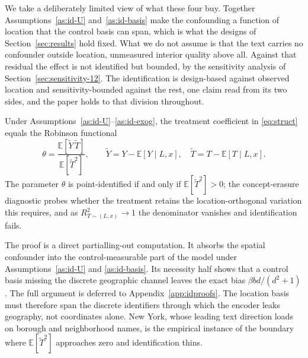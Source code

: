 We take a deliberately limited view of what these four buy. Together
Assumptions~\ref{as:id-U} and~\ref{as:id-basis} make the confounding a function of
location that the control basis can span, which is what the designs of
Section~\ref{sec:results} hold fixed. What we do not assume is that the text carries no
confounder outside location, unmeasured interior quality above all. Against that
residual the effect is not identified but bounded, by the sensitivity analysis of
Section~\ref{sec:sensitivity-12}. The identification is design-based against observed
location and sensitivity-bounded against the rest, one claim read from its two sides,
and the paper holds to that division throughout.

\begin{theorem}[Identification]\label{thm:id}
Under Assumptions~\ref{as:id-U}--\ref{as:id-exog}, the treatment coefficient in
\eqref{eq:struct} equals the Robinson functional
\[
\theta=\frac{\mathbb{E}\!\left[\tilde Y\,\tilde T\right]}{\mathbb{E}\!\left[\tilde T^{2}\right]},
\qquad
\tilde Y=Y-\mathbb{E}[Y\mid L,x],\quad \tilde T=T-\mathbb{E}[T\mid L,x].
\]
The parameter $\theta$ is point-identified if and only if $\mathbb{E}[\tilde T^{2}]>0$;
the concept-erasure diagnostic probes whether the treatment retains the
location-orthogonal variation this requires, and as $R^2_{T\sim(L,x)}\to1$ the
denominator vanishes and identification fails.
\end{theorem}

The proof is a direct partialling-out computation. It absorbs the spatial
confounder into the control-measurable part of the model under
Assumptions~\ref{as:id-U} and \ref{as:id-basis}. Its necessity half shows that
a control basis missing the discrete geographic channel leaves the exact bias
$\beta bd/(d^2+1)$. The full argument is deferred to
Appendix~\ref{app:idproofs}. The location basis must therefore span the discrete
identifiers through which the encoder leaks geography, not coordinates alone.
New York, whose leading text direction loads on borough and neighborhood names, is
the empirical instance of the boundary where $\mathbb{E}[\tilde T^2]$ approaches
zero and identification thins.
